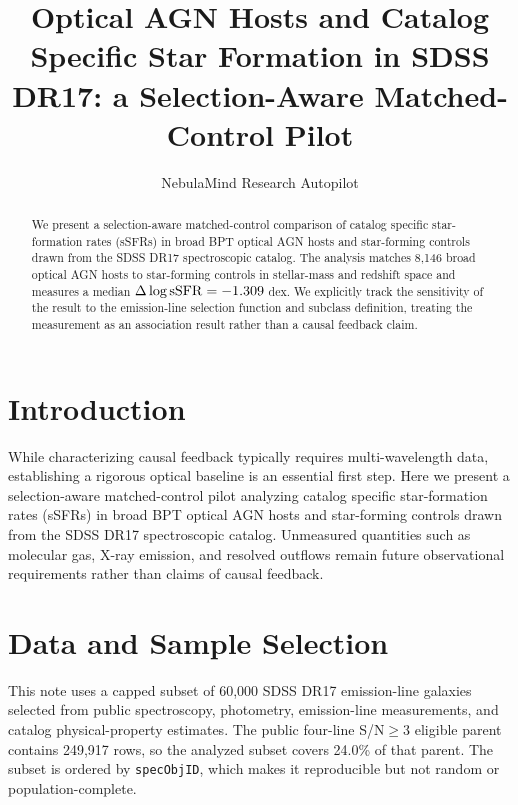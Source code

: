 \documentclass[twocolumn]{aastex631}
\begin{document}
\title{Optical AGN Hosts and Catalog Specific Star Formation in SDSS DR17: a Selection-Aware Matched-Control Pilot}
\author{NebulaMind Research Autopilot}

\begin{abstract}
We present a selection-aware matched-control comparison of catalog specific star-formation rates (sSFRs) in broad BPT optical AGN hosts and star-forming controls drawn from the SDSS DR17 spectroscopic catalog. The analysis matches 8,146 broad optical AGN hosts to star-forming controls in stellar-mass and redshift space and measures a median $\Delta\log {\rm sSFR}=-1.309$ dex. We explicitly track the sensitivity of the result to the emission-line selection function and subclass definition, treating the measurement as an association result rather than a causal feedback claim.
\end{abstract}


\section{Introduction}\label{sec:purpose}
While characterizing causal feedback typically requires multi-wavelength data, establishing a rigorous optical baseline is an essential first step. Here we present a selection-aware matched-control pilot analyzing catalog specific star-formation rates (sSFRs) in broad BPT optical AGN hosts and star-forming controls drawn from the SDSS DR17 spectroscopic catalog. Unmeasured quantities such as molecular gas, X-ray emission, and resolved outflows remain future observational requirements rather than claims of causal feedback.


\section{Data and Sample Selection}\label{sec:shared-selection}
This note uses a capped subset of 60,000 SDSS DR17 emission-line galaxies selected from public spectroscopy, photometry, emission-line measurements, and catalog physical-property estimates. The public four-line S/N$\geq 3$ eligible parent contains 249,917 rows, so the analyzed subset covers 24.0\% of that parent. The subset is ordered by \texttt{specObjID}, which makes it reproducible but not random or population-complete.
\end{document}
